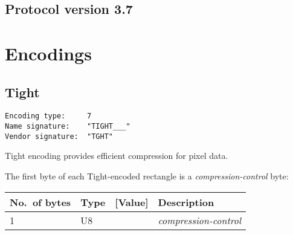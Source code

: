 \documentclass[a4paper]{article}
\newcommand{\typestr}[1]{\textit{#1}}
\begin{document}
\subsection{Protocol version 3.7}

\newpage
\section{Encodings}
\subsection{Tight}
\begin{verbatim}
Encoding type:     7
Name signature:    "TIGHT___"
Vendor signature:  "TGHT"
\end{verbatim}
Tight encoding provides efficient compression for pixel data.

The first byte of each Tight-encoded rectangle is a
\typestr{compression-control} byte:

\begin{tabular}{l|lc|l} \hline
No.\ of bytes & Type & [Value] & Description \\ \hline
1 & U8 &   & \typestr{compression-control} \\ \hline
\end{tabular}
\end{document}

